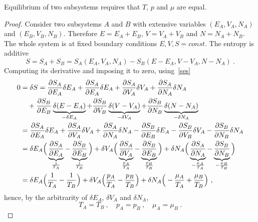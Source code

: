     Equilibrium of two subsystems requires that $T$, $p$ and $\mu$ are equal.
    \begin{proof}
        Consider two subsystems $A$ and $B$ with extensive variables $(E_A, V_A, N_A)$ and $(E_B, V_B, N_B)$. Therefore $E = E_A + E_B$, $V = V_A + V_B$ and $N = N_A + N_B$. The whole system is at fixed boundary conditions $E, V, S = const$. The entropy is additive 
        \begin{equation*}
            S = S_A + S_B = S_A(E_A, V_A, N_A) - S_B(E - E_A, V-V_A, N-N_A) ~.
        \end{equation*}
        Computing its derivative and imposing it to zero, using~\eqref{ses}
        \begin{equation*}
        \begin{aligned}
            0 & = \delta S = \frac{\partial S_A}{\partial E_A} \delta E_A + \frac{\partial S_A}{\partial E_A} \delta E_A + \frac{\partial S_A}{\partial V_A} \delta V_A + \frac{\partial S_A}{\partial N_A} \delta N_A \\ & \quad + \frac{\partial S_B}{\partial E_B} \underbrace{\delta (E - E_A)}_{- \delta E_A} + \frac{\partial S_B}{\partial V_B} \underbrace{\delta (V - V_A)}_{- \delta V_A} + \frac{\partial S_B}{\partial N_B} \underbrace{\delta (N - N_A)}_{- \delta N_A} \\ & = \frac{\partial S_A}{\partial E_A} \delta E_A + \frac{\partial S_A}{\partial V_A} \delta V_A + \frac{\partial S_A}{\partial N_A} \delta N_A - \frac{\partial S_B}{\partial E_B} \delta E_A - \frac{\partial S_B}{\partial V_B}  \delta V_A - \frac{\partial S_B}{\partial N_B} \delta N_A  \\ & = \delta E_A \Big ( \underbrace{\frac{\partial S_A}{\partial E_A}}_{\frac{1}{T_A}} - \underbrace{\frac{\partial S_B}{\partial E_B}}_{\frac{1}{T_B}} \Big) + \delta V_A \Big ( \underbrace{\frac{\partial S_A}{\partial V_A}}_{\frac{p_A}{T_A}} - \underbrace{\frac{\partial S_B}{\partial E_B}}_{\frac{p_B}{T_B}} \Big) + \delta N_A \Big (\underbrace{\frac{\partial S_A}{\partial N_A}}_{ - \frac{\mu_A}{T_A}} - \underbrace{\frac{\partial S_B}{\partial N_B}}_{- \frac{\mu_B}{T_B}} \Big) \\ & = \delta E_A \Big ( \frac{1}{T_A} - \frac{1}{T_B} \Big) + \delta V_A \Big ( \frac{p_A}{T_A} - \frac{p_B}{T_B} \Big) + \delta N_A \Big (- \frac{\mu_A}{T_A} + \frac{\mu_B}{T_B} \Big) ~,
        \end{aligned}
        \end{equation*}
        hence, by the arbitrarity of $\delta E_A$, $\delta V_A$ and $\delta N_A$,
        \begin{equation*}
            T_A = T_B ~, \quad p_A = p_B ~, \quad \mu_A = \mu_B ~.
        \end{equation*}
    \end{proof}

